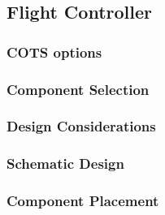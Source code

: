 \subsection{Flight Controller}
\subsubsection{\gls{COTS} options}
\subsubsection{Component Selection}
\subsubsection{Design Considerations}
\subsubsection{Schematic Design}
\subsubsection{Component Placement}

